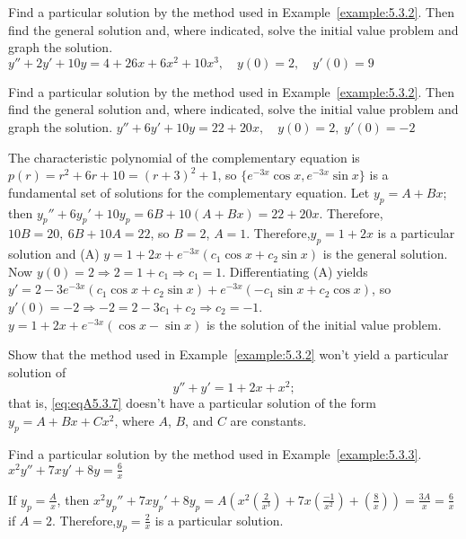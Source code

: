 \documentclass{ximera}
\begin{document}
\begin{problem}\label{exer:5.3.5} Find a
particular solution  by the method used in
Example~\ref{example:5.3.2}. Then find the general
solution and, where indicated, solve the initial value problem
and graph the solution. $y''+2y'+10y=4+26x+6x^2+10x^3, \quad  y(0)=2,
\quad y'(0)=9$
\end{problem}

\begin{problem}\label{exer:5.3.6} Find a
particular solution  by the method used in
Example~\ref{example:5.3.2}. Then find the general
solution and, where indicated, solve the initial value problem
and graph the solution. $y''+6y'+10y=22+20x, \quad  y(0)=2,\;
y'(0)=-2$
\begin{solution}

The characteristic polynomial of the complementary equation is
$p(r)=r^2+6r+10=(r+3)^2+1$, so
$\{e^{-3x}\cos x,e^{-3x}\sin x\}$
is a fundamental set of solutions for the complementary equation.
Let $y_p=A+Bx$; then
$y_p''+6y_p'+10y_p=6B+10(A+Bx)=22+20x$.
Therefore,$10B=20,\  6B+10A=22$, so $B=2$, $A=1$.
Therefore,$y_p=1+2x$ is a particular solution and
(A) $y=1+2x+e^{-3x}(c_1\cos x+c_2\sin x)$ is the general solution.
Now $y(0)=2\Rightarrow 2=1+c_1\Rightarrow c_1=1$. Differentiating (A)
yields
$y'=2-3e^{-3x}(c_1\cos x+c_2\sin x) +e^{-3x}(-c_1\sin x+c_2\cos x)$,
so $y'(0)=-2\Rightarrow
-2=2-3c_1+c_2\Rightarrow c_2=-1$.
 $y=1+2x+e^{-3x}(\cos x-\sin x)$ is the solution of the initial
value problem.
\end{solution}
\end{problem}

\begin{problem}\label{exer:5.3.7}
Show that the method used in Example~\ref{example:5.3.2}
won't yield a particular solution of \begin{equation}\label{eq:eqA5.3.7}
y''+y'=1+2x+x^2;
\end{equation}
that is, \ref{eq:eqA5.3.7} doesn't have a particular
solution of the form $y_p=A+Bx+Cx^2$, where $A$, $B$, and $C$ are
constants.
\end{problem}

\begin{problem}\label{exer:5.3.8} Find a
particular solution by the method used in Example~\ref{example:5.3.3}. $x^2y''+7xy'+8y=\frac{6}{x}$
\begin{solution}
If $y_p=\frac{A}{x}$, then $x^2y_p''+7xy_p'+8y_p=
A\left(x^2\left(\frac{2}{x^3}\right)+7x\left(\frac{-1}{x^2}\right)+\left(\frac{8}{x}\right)\right)=\frac{3A}{x}=\frac{6}{x}$ if $A=2$. Therefore,$y_p=\frac{2}{x}$ is a particular solution.
\end{solution}
\end{problem}
\end{document}

